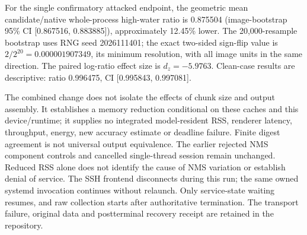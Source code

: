 For the single confirmatory attacked endpoint, the geometric mean
candidate/native whole-process high-water ratio is 0.875504
(image-bootstrap 95\% CI [0.867516, 0.883885]),
approximately 12.45\% lower. The 20,000-resample bootstrap uses
RNG seed 2026111401; the exact two-sided sign-flip value is
$2/2^{20}=0.000001907349$, its minimum resolution, with all image
units in the same direction. The paired log-ratio effect size is
$d_z=-5.9763$. Clean-case results are descriptive: ratio
0.996475, CI [0.995843, 0.997081].


The combined change does not isolate the effects of chunk size and output
assembly. It establishes a memory reduction conditional on these caches
and this device/runtime; it supplies no integrated model-resident RSS,
renderer latency, throughput, energy, new accuracy estimate or deadline
failure. Finite digest agreement is not universal output equivalence.
The earlier rejected NMS component controls and cancelled single-thread
session remain unchanged. Reduced RSS alone does not identify the cause of
NMS variation or establish denial of service.
The SSH frontend disconnects during this run; the same owned systemd
invocation continues without relaunch. Only service-state waiting resumes,
and raw collection starts after authoritative termination. The transport
failure, original data and postterminal recovery receipt are retained in the
repository.
